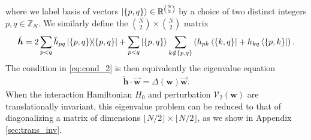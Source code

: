 \documentclass[nofootinbib,notitlepage,11pt]{revtex4-2}
\newcommand{\p}[1]{\left(#1\right)} %
\renewcommand{\set}[1]{\left\{#1\right\}} %
\renewcommand{\c}{\cdot} %
\newcommand{\m}{\bm} %
\renewcommand{\v}{\vec} %
\newcommand{\1}{\mathds{1}}
\newcommand{\V}{\mathcal{V}}
\newcommand{\RR}{\mathbb{R}}
\newcommand{\ZZ}{\mathbb{Z}}
\newcommand{\floor}[1]{\lfloor{#1}\rfloor}
\begin{document}
where we label basis of vectors $\ket{\set{p,q}}\in\RR^{N\choose 2}$
by a choice of two distinct integers $p,q\in\ZZ_N$.  We similarly
define the ${N \choose 2}\times{N \choose 2}$ matrix
\begin{align}
  \check{\m h} = 2\sum_{p<q} \bar h_{pq} \op{\set{p,q}}
  + \sum_{p<q} \ket{\set{p,q}} \sum_{k\notin\set{p,q}}
  \p{h_{pk} \bra{\set{k,q}} + h_{kq} \bra{\set{p,k}}}.
  \label{eq:h_super_mat}
\end{align}
The condition in \eqref{eq:cond_2} is then equivalently the eigenvalue
equation
\begin{align}
  \check{\m h} \c \v{\m w} = \Delta\p{\m w} \v{\m w}.
  \label{eq:cond_2_eig}
\end{align}
When the interaction Hamiltonian $H_0$ and perturbation $\V_2\p{\m w}$
are translationally invariant, this eigenvalue problem can be reduced
to that of diagonalizing a matrix of dimensions
$\floor{N/2}\times\floor{N/2}$, as we show in Appendix
\ref{sec:trans_inv}.
\end{document}
